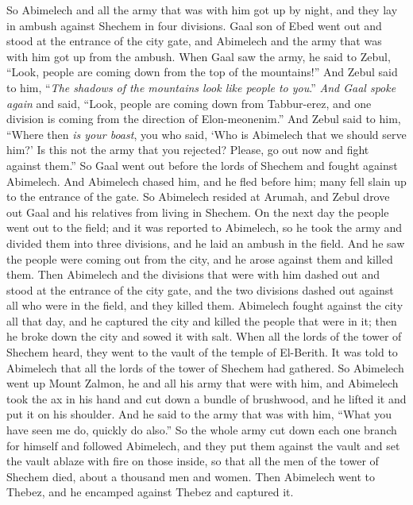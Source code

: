 \begin{biblechapter}
\verse So Abimelech and all the army that was with him got up by night, and they lay in ambush against Shechem in four divisions.
\verse Gaal son of Ebed went out and stood at the entrance of the city gate, and Abimelech and the army that was with him got up from the ambush.
\verse When Gaal saw the army, he said to Zebul, “Look, people are coming down from the top of the mountains!” And Zebul said to him, “\textit{The shadows of the mountains look like people to you}.”
\verse \textit{And Gaal spoke again} and said, “Look, people are coming down from Tabbur-erez, and one division is coming from the direction of Elon-meonenim.”
\verse And Zebul said to him, “Where then \textit{is your boast}, you who said, ‘Who is Abimelech that we should serve him?’ Is this not the army that you rejected? Please, go out now and fight against them.”
\verse So Gaal went out before the lords of Shechem and fought against Abimelech.
\verse And Abimelech chased him, and he fled before him; many fell slain up to the entrance of the gate.
\verse So Abimelech resided at Arumah, and Zebul drove out Gaal and his relatives from living in Shechem.
\verse On the next day the people went out to the field; and it was reported to Abimelech,
\verse so he took the army and divided them into three divisions, and he laid an ambush in the field. And he saw the people were coming out from the city, and he arose against them and killed them.
\verse Then Abimelech and the divisions that were with him dashed out and stood at the entrance of the city gate, and the two divisions dashed out against all who were in the field, and they killed them.
\verse Abimelech fought against the city all that day, and he captured the city and killed the people that were in it; then he broke down the city and sowed it with salt.
\verse When all the lords of the tower of Shechem heard, they went to the vault of the temple of El-Berith.
\verse It was told to Abimelech that all the lords of the tower of Shechem had gathered.
\verse So Abimelech went up Mount Zalmon, he and all his army that were with him, and Abimelech took the ax in his hand and cut down a bundle of brushwood, and he lifted it and put it on his shoulder. And he said to the army that was with him, “What you have seen me do, quickly do also.”
\verse So the whole army cut down each one branch for himself and followed Abimelech, and they put them against the vault and set the vault ablaze with fire on those inside, so that all the men of the tower of Shechem died, about a thousand men and women.
\verse Then Abimelech went to Thebez, and he encamped against Thebez and captured it.

\end{biblechapter}
